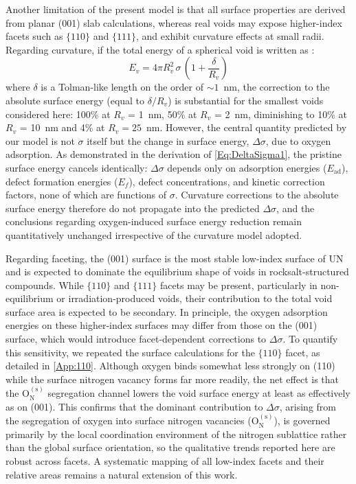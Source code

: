 \documentclass[preprint,12pt,sort&compress]{elsarticle}
\newcommand{\?}{\stackrel{?}{=}}
\begin{document}
Another limitation of the present model is that all surface properties are derived from planar (001) slab calculations, whereas real voids may expose higher-index facets such as $\{110\}$ and $\{111\}$, and exhibit curvature effects at small radii. Regarding curvature, if the total energy of a spherical void is written as \cite{Tolman1949,Chhapadia2011,Wang2021}:
\begin{equation}
E_v = 4 \pi R_v^2 \, \sigma \, \left(1 + \frac{\delta}{R_v} \right)    
\end{equation}
where $\delta$ is a Tolman-like length on the order of $\sim 1$~nm, the correction to the absolute surface energy (equal to $\delta/R_v$) is substantial for the smallest voids considered here: 100\% at $R_v$ = 1~nm, 50\% at $R_v$ = 2~nm, diminishing to 10\% at $R_v$ = 10~nm and 4\% at $R_v = 25$~nm. However, the central quantity predicted by our model is not $\sigma$ itself but the change in surface energy, $\Delta\sigma$, due to oxygen adsorption. As demonstrated in the derivation of \cref{Eq:DeltaSigma1}, the pristine surface energy cancels identically: $\Delta\sigma$ depends only on adsorption energies ($E_\mathrm{ad}$), defect formation energies ($E_f$), defect concentrations, and kinetic correction factors, none of which are functions of $\sigma$. Curvature corrections to the absolute surface energy therefore do not propagate into the predicted $\Delta\sigma$, and the conclusions regarding oxygen-induced surface energy reduction remain quantitatively unchanged irrespective of the curvature model adopted.

Regarding faceting, the (001) surface is the most stable low-index surface of UN \cite{Zhukovskii2009SS} and is expected to dominate the equilibrium shape of voids in rocksalt-structured compounds. While $\{110\}$ and $\{111\}$ facets may be present, particularly in non-equilibrium or irradiation-produced voids, their contribution to the total void surface area is expected to be secondary. In principle, the oxygen adsorption energies on these higher-index surfaces may differ from those on the (001) surface, which would introduce facet-dependent corrections to $\Delta\sigma$. To quantify this sensitivity, we repeated the surface calculations for the $\{110\}$ facet, as detailed in \ref{App:110}. Although oxygen binds somewhat less strongly on (110) while the surface nitrogen vacancy forms far more readily, the net effect is that the $\text{O}_\text{N}^{(\text{s})}$ segregation channel lowers the void surface energy at least as effectively as on (001). This confirms that the dominant contribution to $\Delta\sigma$, arising from the segregation of oxygen into surface nitrogen vacancies (O$_\mathrm{N}^{(\mathrm{s})}$), is governed primarily by the local coordination environment of the nitrogen sublattice rather than the global surface orientation, so the qualitative trends reported here are robust across facets. A systematic mapping of all low-index facets and their relative areas remains a natural extension of this work.
\end{document}
